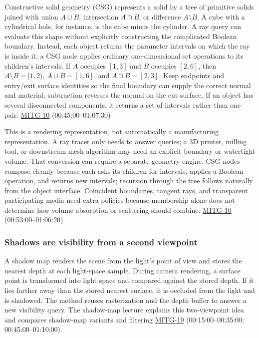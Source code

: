 Constructive solid geometry (CSG) represents a solid by a tree of primitive solids joined with union \(A\cup B\), intersection \(A\cap B\), or difference \(A\setminus B\). A cube with a cylindrical hole, for instance, is the cube minus the cylinder. A ray query can evaluate this shape without explicitly constructing the complicated Boolean boundary. Instead, each object returns the parameter intervals on which the ray is inside it; a CSG node applies ordinary one-dimensional set operations to its children's intervals. If \(A\) occupies \([1,3]\) and \(B\) occupies \([2,6]\), then \(A\setminus B=[1,2)\), \(A\cup B=[1,6]\), and \(A\cap B=[2,3]\). Keep endpoints and entry/exit surface identities so the final boundary can supply the correct normal and material; subtraction reverses the normal on the cut surface. If an object has several disconnected components, it returns a set of intervals rather than one pair. \hyperref[04-visual-computing-ii-ch036]{MITG-10} (00:45:00--01:07:30)

This is a rendering representation, not automatically a manufacturing representation. A ray tracer only needs to answer queries; a 3D printer, milling tool, or downstream mesh algorithm may need an explicit boundary or watertight volume. That conversion can require a separate geometry engine. CSG nodes compose cleanly because each asks its children for intervals, applies a Boolean operation, and returns new intervals; recursion through the tree follows naturally from the object interface. Coincident boundaries, tangent rays, and transparent participating media need extra policies because membership alone does not determine how volume absorption or scattering should combine. \hyperref[04-visual-computing-ii-ch036]{MITG-10} (00:53:00--01:06:20)

\subsubsection{Shadows are visibility from a second viewpoint}\label{shadows-are-visibility-from-a-second-viewpoint}

A shadow map renders the scene from the light's point of view and stores the nearest depth at each light-space sample. During camera rendering, a surface point is transformed into light space and compared against the stored depth. If it lies farther away than the stored nearest surface, it is occluded from the light and is shadowed. The method reuses rasterization and the depth buffer to answer a new visibility query. The shadow-map lecture explains this two-viewpoint idea and compares shadow-map variants and filtering \hyperref[04-visual-computing-ii-ch036]{MITG-19} (00:15:00--00:35:00; 00:45:00--01:10:00).

